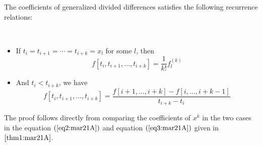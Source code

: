 \begin{thm}\label{thm2:mar21A}
    The coefficients of generalized divided differences satisfies the following recurrence relations: 

    \ 

    \begin{itemize}
        \item If $t_i = t_{i+1 } = \cdots = t_{i+k} = x_l$ for some $l$, then 
        \begin{equation}\label{eq4:mar21A}
            f[t_i, t_{i+1}, \dots, t_{i+k}] = \frac{1}{k!} f^{(k)}_l
        \end{equation}
        \item And $t_i < t_{i+k}$, we have 
        \begin{equation}\label{eq5:mar21A}
            f[t_i, t_{i+1}, \dots, t_{i+k}] = \frac{f[i+1,\dots, i+k] - f[i,\dots,i+k-1]}{t_{i+k} - t_i}
        \end{equation}
    \end{itemize}
\end{thm}
\begin{prf}
    The proof follows directly from comparing the coefficients of $x^k$ in the two cases in the equation $(\ref{eq2:mar21A})$ and equation $(\ref{eq3:mar21A})$ given in  $\ref{thm1:mar21A}$.
\end{prf}